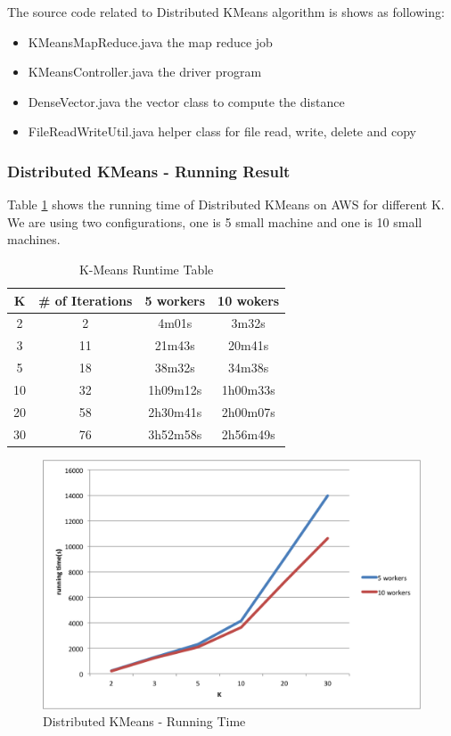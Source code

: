 \documentclass[11pt]{article} %
\begin{document}
The source code related to Distributed KMeans algorithm is shows as following:
\begin{itemize}
\item KMeansMapReduce.java the map reduce job
\item KMeansController.java the driver program
\item DenseVector.java the vector class to compute the distance
\item FileReadWriteUtil.java helper class for file read, write, delete and copy
\end{itemize}

\subsubsection{Distributed KMeans - Running Result}
Table \ref{table: kmean-running-time-table} shows the running time of Distributed KMeans on AWS for different K. We are using two configurations, one is 5 small machine and one is 10 small machines.

\begin{table}[htdp]
\caption{K-Means Runtime Table}
\begin{center}
\begin{tabular}{|c|c|c|c|}
\hline
K & \# of Iterations & 5 workers & 10 wokers\\ \hline
2 & 2 &	4m01s & 3m32s \\ \hline
3 & 11 &	21m43s & 20m41s\\ \hline
5 &	18 & 38m32s & 34m38s\\ \hline
10 & 32 & 1h09m12s & 1h00m33s	\\ \hline
20 & 58 & 2h30m41s & 2h00m07s	\\ \hline
30 & 76 & 3h52m58s & 2h56m49s	\\ \hline
\end{tabular}
\end{center}
\label{table: kmean-running-time-table}
\end{table}%

\begin{figure}[htbp]
\begin{center}
\includegraphics[scale=0.7]{dkmeans-runtime.png}
\caption{Distributed KMeans - Running Time}
\label{fig:dkmeans-runtime}
\end{center}
\end{figure}
\end{document}
